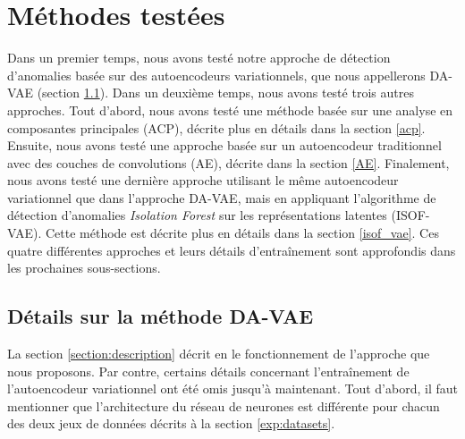 \section{Méthodes testées} \label{exp:methods}

Dans un premier temps, nous avons testé notre approche de détection d'anomalies basée sur des autoencodeurs variationnels, que nous appellerons DA-VAE (section \ref{DA_VAE}). Dans un deuxième temps, nous avons testé trois autres approches. Tout d'abord, nous avons testé une méthode basée sur une analyse en composantes principales (ACP), décrite plus en détails dans la section \ref{acp}. Ensuite, nous avons testé une approche basée sur un autoencodeur traditionnel avec des couches de convolutions (AE), décrite dans la section \ref{AE}. Finalement, nous avons testé une dernière approche utilisant le même autoencodeur variationnel que dans l'approche DA-VAE, mais en appliquant l'algorithme de détection d'anomalies \textit{Isolation Forest} \citep{4781136} sur les représentations latentes (ISOF-VAE). Cette méthode est décrite plus en détails dans la section \ref{isof_vae}. Ces quatre différentes approches et leurs détails d'entraînement sont approfondis dans les prochaines sous-sections.

\subsection{Détails sur la méthode DA-VAE} \label{DA_VAE}

La section \ref{section:description} décrit en \DIFdelbegin {}\DIFdelend \DIFaddbegin {}\DIFaddend le fonctionnement de l'approche que nous proposons. Par contre, certains détails concernant l'entraînement de l'autoencodeur variationnel ont été omis jusqu'à maintenant. Tout d'abord, il faut mentionner que l'architecture du réseau de neurones est différente pour chacun des deux jeux de données décrits à la section \ref{exp:datasets}.

